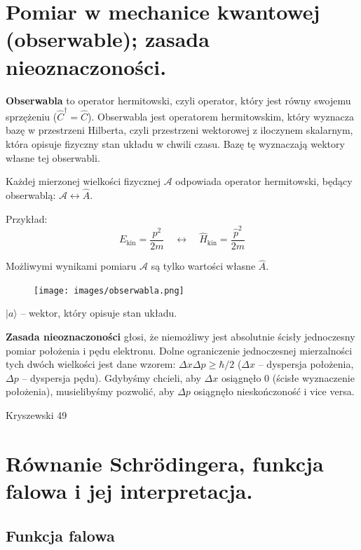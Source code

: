 \documentclass{article}
\begin{document}
\section{Pomiar w mechanice kwantowej (obserwable); zasada nieoznaczoności.}
\textbf{Obserwabla} to operator hermitowski, czyli operator, który jest równy swojemu sprzężeniu ($\hat{C}^\dagger=\hat{C}$). Obserwabla jest operatorem hermitowskim, który wyznacza bazę w przestrzeni Hilberta, czyli przestrzeni wektorowej z iloczynem skalarnym, która opisuje fizyczny stan układu w chwili czasu. Bazę tę wyznaczają wektory własne tej obserwabli. 

Każdej mierzonej wielkości fizycznej $\mathcal{A}$ odpowiada operator hermitowski, będący obserwablą: $\mathcal{A} \longleftrightarrow \hat{A}$. 

Przykład:
\begin{equation*}
    E_\text{kin}=\frac{p^2}{2m}\quad\leftrightarrow\quad\hat{H}_\text{kin}=\frac{\hat{p}^2}{2m}
\end{equation*}

Możliwymi wynikami pomiaru $\mathcal{A}$ są tylko wartości własne $\hat{A}$.

\begin{figure}[H]
    \centering
    \texttt{[image: images/obserwabla.png]}
\end{figure}

$|a\rangle $ -- wektor, który opisuje stan układu.


\textbf{Zasada nieoznaczoności} głosi, że niemożliwy jest absolutnie ścisły jednoczesny pomiar położenia i pędu elektronu. Dolne ograniczenie jednoczesnej mierzalności tych dwóch wielkości jest dane wzorem: $\Delta x \Delta p \geq \hbar/2$ ($\Delta x$ -- dyspersja położenia, $\Delta p $  -- dyspersja pędu). Gdybyśmy chcieli, aby $\Delta x$ osiągnęło 0 (ścisłe wyznaczenie położenia), musielibyśmy pozwolić, aby $\Delta p$ osiągnęło nieskończoność i vice versa.

Kryszewski 49

\section{Równanie Schrödingera, funkcja falowa i jej interpretacja.}

\subsection{Funkcja falowa}
\end{document}
